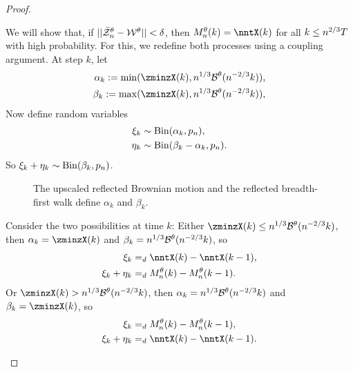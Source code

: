 \begin{proof}
\begin{proofpart}
We will show that, if $||\bar{\mathcal{Z}}^{\theta}_n - \mathcal{W}^{\theta}|| < \delta$, 
then $\Ndis(k) = \nntX(k)$ for all $k \leq n^{2 / 3}T$ with high probability.
For this, we redefine both processes using a coupling argument.
At step $k$, let
\begin{equation} \label{E: def alpha beta}
\begin{aligned}
\alpha_k := \min(\zminzX(k), \n{1}{3}\BtX(\n{-2}{3}k)), \\
\beta_k := \max(\zminzX(k), \n{1}{3}\BtX(\n{-2}{3}k)),
\end{aligned}
\end{equation}
Now define random variables
\begin{equation} \label{E: def xi eta}
\begin{aligned}
\xi_k &\sim \operatorname*{Bin}(\alpha_k, p_n), \\
\eta_k &\sim \operatorname*{Bin}(\beta_k - \alpha_k, p_n).
\end{aligned}
\end{equation}
So $\xi_k + \eta_k \sim \operatorname*{Bin}(\beta_k, p_n)$.

\begin{figure}[ht]
	\centering
	
	\caption{The upscaled reflected Brownian motion and the reflected breadth-first walk define $\alpha_k$ and $\beta_k$.} 
	\label{F: BM BF-walk}
\end{figure}

Consider the two possibilities at time $k$:
Either $\zminzX(k) \leq \n{1}{3}\BtX(\n{-2}{3}k)$,
then $\alpha_k = \zminzX(k)$ and $\beta_k = n^{1 / 3}\mathcal{B}^{\theta}(n^{-2 / 3}k)$, 
so 
\begin{equation}
\begin{aligned}
\xi_k &=_d \nntX(k) - \nntX(k-1), \\
\xi_k + \eta_k &=_d \Ndis(k) - \Ndis(k-1).
\end{aligned}
\end{equation}
Or $\zminzX(k) > \n{1}{3}\BtX(\n{-2}{3}k)$,
then $\alpha_k = n^{1 / 3}\mathcal{B}^{\theta}(n^{-2 / 3}k)$ and $\beta_k = \zminzX(k)$, 
so
\begin{equation}
\begin{aligned}
\xi_k &=_d \Ndis(k) - \Ndis(k-1), \\
\xi_k + \eta_k &=_d \nntX(k) - \nntX(k-1).
\end{aligned}
\end{equation}


\end{proofpart}
\end{proof}
